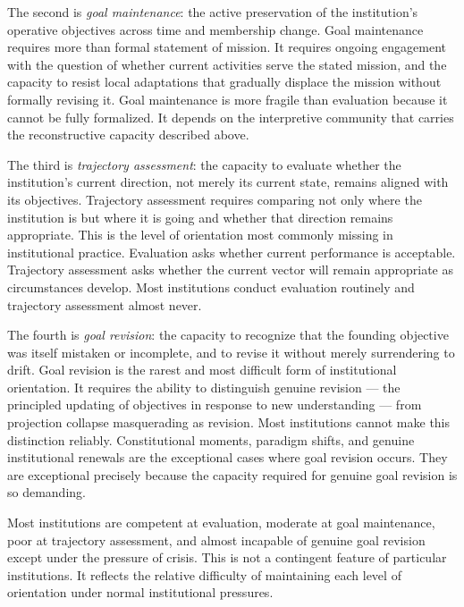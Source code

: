 The second is \emph{goal maintenance}: the active preservation of the
institution's operative objectives across time and membership change. Goal
maintenance requires more than formal statement of mission. It requires
ongoing engagement with the question of whether current activities serve
the stated mission, and the capacity to resist local adaptations that
gradually displace the mission without formally revising it. Goal maintenance
is more fragile than evaluation because it cannot be fully formalized. It
depends on the interpretive community that carries the reconstructive capacity
described above.

The third is \emph{trajectory assessment}: the capacity to evaluate whether
the institution's current direction, not merely its current state, remains
aligned with its objectives. Trajectory assessment requires comparing not
only where the institution is but where it is going and whether that direction
remains appropriate. This is the level of orientation most commonly missing
in institutional practice. Evaluation asks whether current performance is
acceptable. Trajectory assessment asks whether the current vector will remain
appropriate as circumstances develop. Most institutions conduct evaluation
routinely and trajectory assessment almost never.

The fourth is \emph{goal revision}: the capacity to recognize that the
founding objective was itself mistaken or incomplete, and to revise it without
merely surrendering to drift. Goal revision is the rarest and most difficult
form of institutional orientation. It requires the ability to distinguish
genuine revision --- the principled updating of objectives in response to
new understanding --- from projection collapse masquerading as revision.
Most institutions cannot make this distinction reliably. Constitutional
moments, paradigm shifts, and genuine institutional renewals are the
exceptional cases where goal revision occurs. They are exceptional precisely
because the capacity required for genuine goal revision is so demanding.

\begin{observation}
Most institutions are competent at evaluation, moderate at goal maintenance,
poor at trajectory assessment, and almost incapable of genuine goal revision
except under the pressure of crisis. This is not a contingent feature of
particular institutions. It reflects the relative difficulty of maintaining
each level of orientation under normal institutional pressures.
\end{observation}

